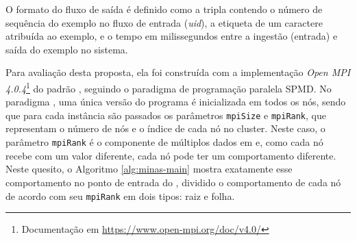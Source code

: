 O formato do fluxo de saída é definido como a tripla contendo o número de
sequência do exemplo no fluxo de entrada (\emph{uid}), a etiqueta de um caractere
atribuída ao exemplo, e o tempo em milissegundos entre a ingestão (entrada) e saída
do exemplo no sistema.


Para avaliação desta proposta, ela foi construída com a implementação \emph{Open
MPI 4.0.4}\footnote{Documentação em \url{https://www.open-mpi.org/doc/v4.0/}} do
padrão \mpi, seguindo o paradigma de programação paralela \acf{SPMD}.
No paradigma \spmd, uma única versão do programa é inicializada em todos os nós, sendo que
para cada instância são passados os parâmetros \texttt{mpiSize} e
\texttt{mpiRank}, que representam o número de nós e o índice de cada nó no
cluster.
Neste caso, o parâmetro \texttt{mpiRank} é o componente de múltiplos dados em
\spmd e, como cada nó recebe com um valor diferente, cada nó pode ter um
comportamento diferente.
Neste quesito, o Algoritmo \ref{alg:minas-main} mostra exatamente esse
comportamento no ponto de entrada do \mfog, dividido o comportamento de cada nó
de acordo com seu \texttt{mpiRank} em dois tipos: raiz e folha.



